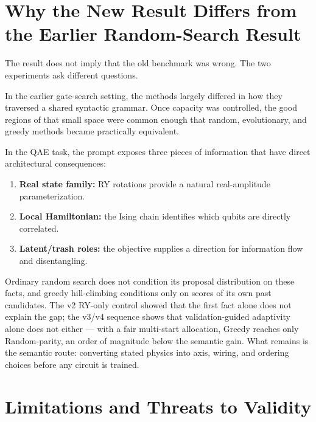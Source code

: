 \documentclass[11pt]{article}
\begin{document}
\section{Why the New Result Differs from the Earlier Random-Search Result}

The result does not imply that the old benchmark was wrong.
The two experiments ask different questions.

In the earlier gate-search setting, the methods largely differed in how they traversed a shared syntactic grammar.
Once capacity was controlled, the good regions of that small space were common enough that random, evolutionary, and greedy methods became practically equivalent.

In the QAE task, the prompt exposes three pieces of information that have direct architectural consequences:
\begin{enumerate}[nosep]
\item \textbf{Real state family:} RY rotations provide a natural real-amplitude parameterization.
\item \textbf{Local Hamiltonian:} the Ising chain identifies which qubits are directly correlated.
\item \textbf{Latent/trash roles:} the objective supplies a direction for information flow and disentangling.
\end{enumerate}
Ordinary random search does not condition its proposal distribution on these facts, and greedy hill-climbing conditions only on scores of its own past candidates.
The v2 RY-only control showed that the first fact alone does not explain the gap; the v3/v4 sequence shows that validation-guided adaptivity alone does not either --- with a fair multi-start allocation, Greedy reaches only Random-parity, an order of magnitude below the semantic gain.
What remains is the semantic route: converting stated physics into axis, wiring, and ordering choices before any circuit is trained.

\section{Limitations and Threats to Validity}
\end{document}
